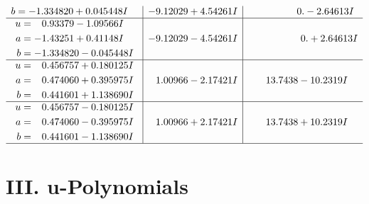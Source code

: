 \documentclass[1p]{elsarticle_modified}
\theoremstyle{definition}
\begin{document}
$$\begin{array}{c|c|c}
\begin{aligned}
b &= -1.334820 + 0.045448 I\end{aligned}
 & -9.12029 + 4.54261 I & \phantom{-0.000000 } 0. - 2.64613 I \\ \hline\begin{aligned}
u &= \phantom{-}0.93379 - 1.09566 I \\
a &= -1.43251 + 0.41148 I \\
b &= -1.334820 - 0.045448 I\end{aligned}
 & -9.12029 - 4.54261 I & \phantom{-0.000000 -}0. + 2.64613 I \\ \hline\begin{aligned}
u &= \phantom{-}0.456757 + 0.180125 I \\
a &= \phantom{-}0.474060 + 0.395975 I \\
b &= \phantom{-}0.441601 + 1.138690 I\end{aligned}
 & \phantom{-}1.00966 - 2.17421 I & \phantom{-}13.7438 - 10.2319 I \\ \hline\begin{aligned}
u &= \phantom{-}0.456757 - 0.180125 I \\
a &= \phantom{-}0.474060 - 0.395975 I \\
b &= \phantom{-}0.441601 - 1.138690 I\end{aligned}
 & \phantom{-}1.00966 + 2.17421 I & \phantom{-}13.7438 + 10.2319 I\\
 \hline 
 \end{array}$$\newpage
\newpage\renewcommand{\arraystretch}{1}
\centering \section*{ III. u-Polynomials}
\end{document}
